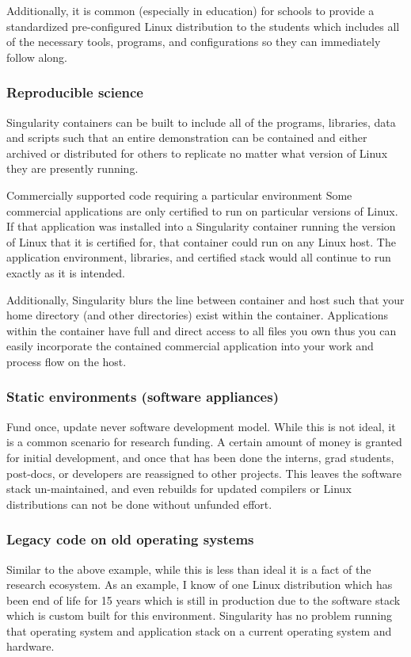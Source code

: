 \documentclass[letterpaper,10pt,english]{sphinxmanual}
\begin{document}
Additionally, it is common (especially in education) for schools to provide a standardized pre-configured Linux distribution to the students which includes all of the necessary tools, programs, and configurations so they can immediately follow along.


\subsubsection{Reproducible science}
\label{\detokenize{introduction:reproducible-science}}
Singularity containers can be built to include all of the programs, libraries, data and scripts such that an entire demonstration can be contained and either archived or distributed for others to replicate no matter what version of Linux they are presently running.

Commercially supported code requiring a particular environment Some commercial applications are only certified to run on particular versions of Linux. If that application was installed into a Singularity container running the version of Linux that it is certified for, that container could run on any Linux host. The application environment, libraries, and certified stack would all continue to run exactly as it is intended.

Additionally, Singularity blurs the line between container and host such that your home directory (and other directories) exist within the container. Applications within the container have full and direct access to all files you own thus you can easily incorporate the contained commercial application into your work and process flow on the host.


\subsubsection{Static environments (software appliances)}
\label{\detokenize{introduction:static-environments-software-appliances}}
Fund once, update never software development model. While this is not ideal, it is a common scenario for research funding. A certain amount of money is granted for initial development, and once that has been done the interns, grad students, post-docs, or developers are reassigned to other projects. This leaves the software stack un-maintained, and even rebuilds for updated compilers or Linux distributions can not be done without unfunded effort.


\subsubsection{Legacy code on old operating systems}
\label{\detokenize{introduction:legacy-code-on-old-operating-systems}}
Similar to the above example, while this is less than ideal it is a fact of the research ecosystem. As an example, I know of one Linux distribution which has been end of life for 15 years which is still in production due to the software stack which is custom built for this environment. Singularity has no problem running that operating system and application stack on a current operating system and hardware.
\end{document}
